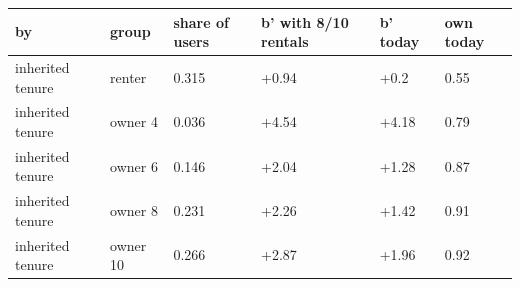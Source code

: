 \begingroup\small
\setlength{\tabcolsep}{3pt}
\renewcommand{\arraystretch}{1.04}
\begin{tabularx}{\linewidth}{XXXXXX}
\toprule
by & group & share of users & b' with 8/10 rentals & b' today & own today \\
\midrule
inherited tenure & renter & 0.315 & +0.94 & +0.2 & 0.55 \\
inherited tenure & owner 4 & 0.036 & +4.54 & +4.18 & 0.79 \\
inherited tenure & owner 6 & 0.146 & +2.04 & +1.28 & 0.87 \\
inherited tenure & owner 8 & 0.231 & +2.26 & +1.42 & 0.91 \\
inherited tenure & owner 10 & 0.266 & +2.87 & +1.96 & 0.92 \\
\bottomrule
\end{tabularx}
\endgroup
